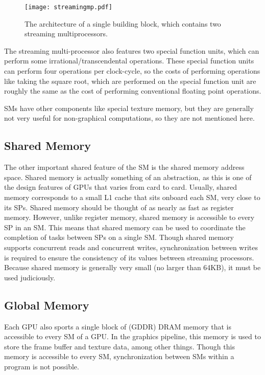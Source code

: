 \documentclass[12pt,twoside]{reedthesis}
\begin{document}
\begin{figure}[h!]
\begin{center}
\texttt{[image: streamingmp.pdf]}
\end{center}
\caption{The architecture of a single building block, which contains two streaming multiprocessors.}
\end{figure}
\label{streamingmp}
\vspace{1pc}

The streaming multi-processor also features two special function units, which can perform some irrational/transcendental operations. These special function units can perform four operations per clock-cycle, so the costs of performing operations like taking the square root, which are performed on the special function unit are roughly the same as the cost of performing conventional floating point operations.

SMs have other components like special texture memory, but they are generally not very useful for non-graphical computations, so they are not mentioned here.

\subsection{Shared Memory}

The other important shared feature of the SM is the shared memory address space. Shared memory is actually something of an abstraction, as this is one of the design features of GPUs that varies from card to card. Usually, shared memory corresponds to a small L1 cache that sits onboard each SM, very close to its SPs. Shared memory should be thought of as nearly as fast as register memory. However, unlike register memory, shared memory is accessible to every SP in an SM. This means that shared memory can be used to coordinate the completion of tasks between SPs on a single SM. Though shared memory supports concurrent reads and concurrent writes, synchronization between writes is required to ensure the consistency of its values between streaming processors. Because shared memory is generally very small (no larger than 64KB), it must be used judiciously.

\subsection{Global Memory}
\label{globalmem}

Each GPU also sports a single block of (GDDR) DRAM memory that is accessible to every SM of a GPU. In the graphics pipeline, this memory is used to store the frame buffer and texture data, among other things. Though this memory is accessible to every SM, synchronization between SMs within a program is not possible.
\end{document}

